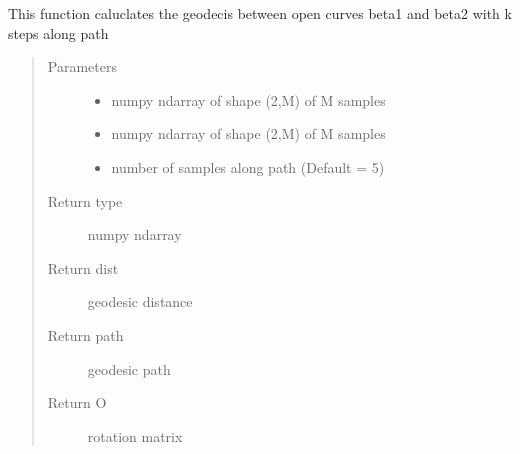\documentclass[letterpaper,10pt,english]{sphinxmanual}
\begin{document}
\begin{fulllineitems}
\label{\detokenize{geodesic:geodesic.geod_sphere}}
This function caluclates the geodecis between open curves beta1 and
beta2 with k steps along path
\begin{quote}\begin{description}
\item[{Parameters}] \leavevmode\begin{itemize}
\item {} 
 \textendash{} numpy ndarray of shape (2,M) of M samples

\item {} 
 \textendash{} numpy ndarray of shape (2,M) of M samples

\item {} 
 \textendash{} number of samples along path (Default = 5)

\end{itemize}

\item[{Return type}] \leavevmode
numpy ndarray

\item[{Return dist}] \leavevmode
geodesic distance

\item[{Return path}] \leavevmode
geodesic path

\item[{Return O}] \leavevmode
rotation matrix

\end{description}\end{quote}

\end{fulllineitems}

\end{document}
